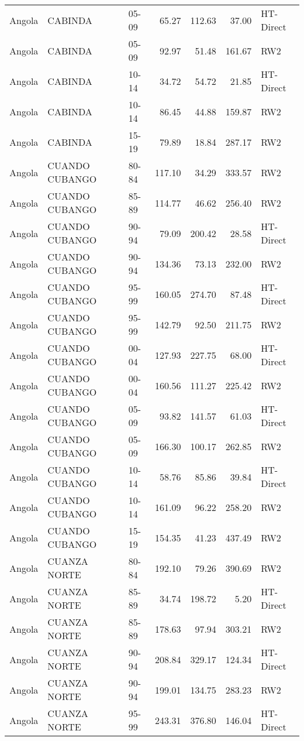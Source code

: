 \begin{longtable}{lllrrrl}
  Angola & CABINDA & 05-09 & 65.27 & 112.63 & 37.00 & HT-Direct \\ 
  Angola & CABINDA & 05-09 & 92.97 & 51.48 & 161.67 & RW2 \\ 
  Angola & CABINDA & 10-14 & 34.72 & 54.72 & 21.85 & HT-Direct \\ 
  Angola & CABINDA & 10-14 & 86.45 & 44.88 & 159.87 & RW2 \\ 
  Angola & CABINDA & 15-19 & 79.89 & 18.84 & 287.17 & RW2 \\ 
  Angola & CUANDO CUBANGO & 80-84 & 117.10 & 34.29 & 333.57 & RW2 \\ 
  Angola & CUANDO CUBANGO & 85-89 & 114.77 & 46.62 & 256.40 & RW2 \\ 
  Angola & CUANDO CUBANGO & 90-94 & 79.09 & 200.42 & 28.58 & HT-Direct \\ 
  Angola & CUANDO CUBANGO & 90-94 & 134.36 & 73.13 & 232.00 & RW2 \\ 
  Angola & CUANDO CUBANGO & 95-99 & 160.05 & 274.70 & 87.48 & HT-Direct \\ 
  Angola & CUANDO CUBANGO & 95-99 & 142.79 & 92.50 & 211.75 & RW2 \\ 
  Angola & CUANDO CUBANGO & 00-04 & 127.93 & 227.75 & 68.00 & HT-Direct \\ 
  Angola & CUANDO CUBANGO & 00-04 & 160.56 & 111.27 & 225.42 & RW2 \\ 
  Angola & CUANDO CUBANGO & 05-09 & 93.82 & 141.57 & 61.03 & HT-Direct \\ 
  Angola & CUANDO CUBANGO & 05-09 & 166.30 & 100.17 & 262.85 & RW2 \\ 
  Angola & CUANDO CUBANGO & 10-14 & 58.76 & 85.86 & 39.84 & HT-Direct \\ 
  Angola & CUANDO CUBANGO & 10-14 & 161.09 & 96.22 & 258.20 & RW2 \\ 
  Angola & CUANDO CUBANGO & 15-19 & 154.35 & 41.23 & 437.49 & RW2 \\ 
  Angola & CUANZA NORTE & 80-84 & 192.10 & 79.26 & 390.69 & RW2 \\ 
  Angola & CUANZA NORTE & 85-89 & 34.74 & 198.72 & 5.20 & HT-Direct \\ 
  Angola & CUANZA NORTE & 85-89 & 178.63 & 97.94 & 303.21 & RW2 \\ 
  Angola & CUANZA NORTE & 90-94 & 208.84 & 329.17 & 124.34 & HT-Direct \\ 
  Angola & CUANZA NORTE & 90-94 & 199.01 & 134.75 & 283.23 & RW2 \\ 
  Angola & CUANZA NORTE & 95-99 & 243.31 & 376.80 & 146.04 & HT-Direct \\ 

\end{longtable}
